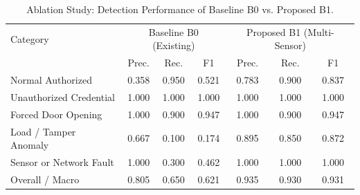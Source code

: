 \begin{table}[!htbp]
\renewcommand{\arraystretch}{1.02}
\centering
\small
\caption{Ablation Study: Detection Performance of Baseline B0 vs. Proposed B1.}
\label{tab:b0_vs_b1}
\vspace{4pt}
\begin{tabular}{l ccc ccc}
\hline
Category & \multicolumn{3}{c}{Baseline B0 (Existing)} & \multicolumn{3}{c}{Proposed B1 (Multi-Sensor)} \\
 & Prec. & Rec. & F1 & Prec. & Rec. & F1 \\
\hline
\rule{0pt}{2.6ex}Normal Authorized & 0.358 & 0.950 & 0.521 & 0.783 & 0.900 & 0.837 \\
Unauthorized Credential & 1.000 & 1.000 & 1.000 & 1.000 & 1.000 & 1.000 \\
Forced Door Opening & 1.000 & 0.900 & 0.947 & 1.000 & 0.900 & 0.947 \\
Load / Tamper Anomaly & 0.667 & 0.100 & 0.174 & 0.895 & 0.850 & 0.872 \\
Sensor or Network Fault & 1.000 & 0.300 & 0.462 & 1.000 & 1.000 & 1.000 \\
\hline
\rule{0pt}{2.6ex}Overall / Macro & 0.805 & 0.650 & 0.621 & 0.935 & 0.930 & 0.931 \\
\hline
\end{tabular}
\end{table}
